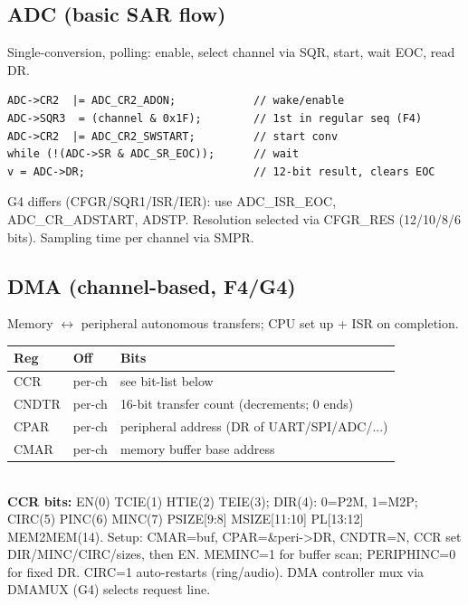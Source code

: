 \subsection{ADC (basic SAR flow)}
Single-conversion, polling: enable, select channel via SQR, start, wait EOC, read DR.
\begin{lstlisting}[language={}]
ADC->CR2  |= ADC_CR2_ADON;            // wake/enable
ADC->SQR3  = (channel & 0x1F);        // 1st in regular seq (F4)
ADC->CR2  |= ADC_CR2_SWSTART;         // start conv
while (!(ADC->SR & ADC_SR_EOC));      // wait
v = ADC->DR;                          // 12-bit result, clears EOC
\end{lstlisting}
G4 differs (CFGR/SQR1/ISR/IER): use ADC\_ISR\_EOC, ADC\_CR\_ADSTART, ADSTP. Resolution selected via CFGR\_RES (12/10/8/6 bits). Sampling time per channel via SMPR.

\subsection{DMA (channel-based, F4/G4)}
Memory $\leftrightarrow$ peripheral autonomous transfers; CPU set up + ISR on completion.
\begin{tabular}{@{}llp{}@{}}
\toprule
\textbf{Reg} & \textbf{Off} & \textbf{Bits}\\
\midrule
CCR    & per-ch & see bit-list below\\
CNDTR  & per-ch & 16-bit transfer count (decrements; 0 ends)\\
CPAR   & per-ch & peripheral address (DR of UART/SPI/ADC/...)\\
CMAR   & per-ch & memory buffer base address\\
\bottomrule
\end{tabular}\\
\textbf{CCR bits:} EN(0) TCIE(1) HTIE(2) TEIE(3); DIR(4): 0=P2M, 1=M2P; CIRC(5) PINC(6) MINC(7) PSIZE[9:8] MSIZE[11:10] PL[13:12] MEM2MEM(14).
Setup: CMAR=buf, CPAR=\&peri->DR, CNDTR=N, CCR set DIR/MINC/CIRC/sizes, then EN. MEMINC=1 for buffer scan; PERIPHINC=0 for fixed DR. CIRC=1 auto-restarts (ring/audio). DMA controller mux via DMAMUX (G4) selects request line.

